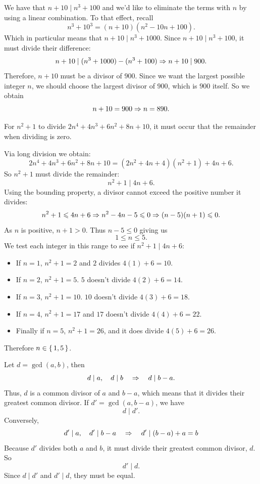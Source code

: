 \documentclass[12pt]{memoir}
\begin{document}
\begin{Ej}
    We have that \(n+10 \mid n^3 + 100\) and we'd like to eliminate the terms with \(n\) by using a linear combination. To that effect, recall
    \[
    n^3 + 10^3 = (n+10)(n^2 - 10n + 100).
    \]
    Which in particular means that \(n+10 \mid n^3 + 1000\). 
    Since \(n+10 \mid n^3+100\), it must divide their difference:
    \[
    n+10\mid (n^3 + 1000) - (n^3 + 100) \To n+10\mid 900.
    \]
    Therefore, \(n+10\) must be a divisor of \(900\). Since we want the largest possible integer \(n\), we should choose the largest divisor of \(900\), which is \(900\) itself. So we obtain 
    \[
    n+10 = 900 \Rightarrow n = 890.
    \]
\end{Ej}

\begin{Ej}
    For  \(n^2 + 1\) to divide \(2n^4 + 4n^3 + 6n^2 + 8n + 10\), it must occur that the remainder when dividing is zero.\par
    Via long division we obtain:
    \[
    2n^4 + 4n^3 + 6n^2 + 8n + 10 = (2n^2 + 4n + 4)(n^2 + 1) + 4n + 6.
    \]
    So \(n^2+1\) must divide the remainder: 
    \[
    n^2 + 1 \mid 4n + 6.
    \]
    Using the bounding property, a divisor cannot exceed the positive number it divides:
    \[
    n^2 + 1 \leqslant 4n + 6 \Rightarrow n^2 - 4n - 5 \leqslant 0 \Rightarrow (n-5)(n+1) \leqslant 0.
    \]
    As \(n\) is positive, \(n+1 > 0\). Thus \(n - 5 \leq 0\) giving us
    \[
    1\leq n\leq 5.
    \]
    We test each integer in this range to see if \(n^2+1 \mid 4n+6\):
    \begin{itemize}
        \item If \(n=1\), \(n^2+1=2\) and \(2\) divides \(4(1)+6=10\).
        \item If \(n=2\), \(n^2+1=5\). \(5\) doesn't divide \(4(2)+6=14\).
        \item If \(n=3\), \(n^2+1=10\). \(10\) doesn't divide \(4(3)+6=18\).
        \item If \(n=4\), \(n^2+1=17\) and \(17\) doesn't divide \(4(4)+6=22\).
        \item Finally if \(n=5\), \(n^2+1=26\), and it does divide \(4(5)+6=26\).
    \end{itemize}
    Therefore \(n \in \{\,1, 5\,\}\).
\end{Ej}

\begin{Ej}
    Let \(d = \gcd(a, b)\), then
    \[
    d\mid a,\quad d\mid b\quad\To\quad d\mid b-a.
    \]
    Thus, \(d\) is a common divisor of \(a\) and \(b - a\), which means that it divides their greatest common divisor. If \(d' = \gcd(a, b - a)\), we have
    \[
    d \mid d'.
    \]
    Conversely, 
    \[
    d'\mid a,\quad d'\mid b-a\quad\To\quad d'\mid (b-a)+a=b
    \]
    Because \(d'\) divides both \(a\) and \(b\), it must divide their greatest common divisor, \(d\). So 
    \[
    d' \mid d.
    \]
    Since \(d \mid d'\) and \(d' \mid d\), they must be equal.
\end{Ej}
\end{document}
